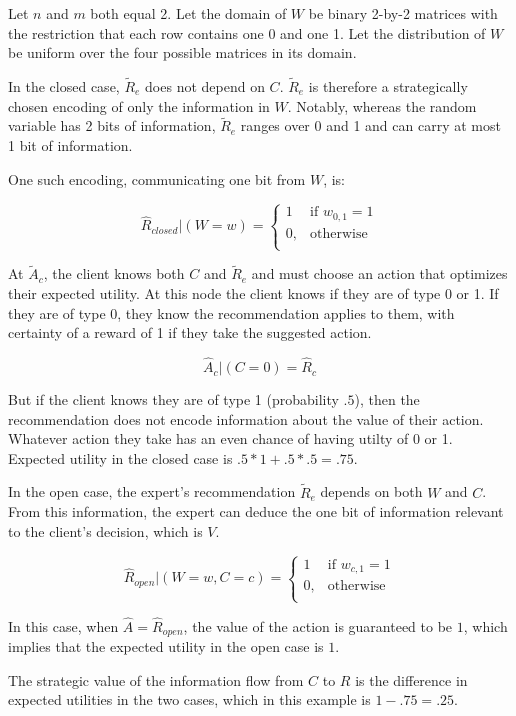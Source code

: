 \documentclass[../thesis.tex]{subfiles}
\begin{document}
\begin{exm}
  Let $n$ and $m$ both equal 2.
  Let the domain of $W$ be binary 2-by-2 matrices with
  the restriction that each row contains one 0 and one 1.
  Let the distribution of $W$ be uniform over the four
  possible matrices in its domain.

  In the closed case, $\tilde{R}_e$ does not depend on $C$.
  $\tilde{R}_e$ is therefore a strategically chosen encoding
  of only the information in $W$.
  Notably, whereas the random variable has 2 bits of information,
  $\tilde{R}_e$ ranges over 0 and 1 and can carry at most 1 bit of
  information.

  One such encoding, communicating one bit from $W$, is:

  $$\hat{R}_{closed} \vert (W = w) = \begin{cases}
    1 & \text{if } w_{0,1} = 1 \\
    0, & \text{otherwise}\\
  \end{cases}$$

  At $\tilde{A}_c$, the client knows both $C$ and $\tilde{R}_e$
  and must choose an action that optimizes their expected utility. 
  At this node the client knows if they are of type 0 or 1.
  If they are of type 0, they know the recommendation applies 
  to them, with certainty of a reward of 1 if they take the suggested action. 

  $$\hat{A}_c \vert (C = 0) = \hat{R}_c$$

  But if the client knows they are of type 1 (probability $.5$),
  then the recommendation
  does not encode information about the value of their action.
  Whatever action they take has an even chance of having utilty of 0 or 1.
  Expected utility in the closed case is $.5 * 1 + .5 * .5 = .75$.
  
  In the open case, the expert's recommendation $\tilde{R}_e$
  depends on both $W$ and $C$.
  From this information, the expert can deduce the one bit of
  information relevant to the client's decision, which is
  $V$.

  $$\hat{R}_{open} \vert (W = w, C = c) = \begin{cases}
    1 & \text{if } w_{c,1} = 1 \\
    0, & \text{otherwise}\\
  \end{cases}$$

  In this case, when $\hat{A} = \hat{R}_{open}$,
  the value of the action is guaranteed to be $1$,
  which implies that the expected utility in the
  open case is $1$.

  The strategic value of the information flow from
  $C$ to $R$ is the difference in expected utilities
  in the two cases, which in this example is $1 - .75 = .25$.
\end{exm}
\end{document}
